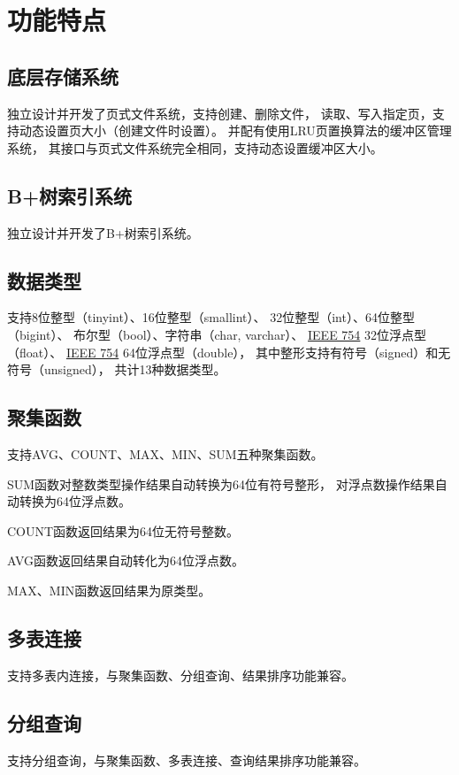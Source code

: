 \section{功能特点}
    \subsection{底层存储系统}
        独立设计并开发了页式文件系统，支持创建、删除文件，%
        读取、写入指定页，支持动态设置页大小（创建文件时设置）。%
        并配有使用LRU页置换算法的缓冲区管理系统，%
        其接口与页式文件系统完全相同，支持动态设置缓冲区大小。
    \subsection{B+树索引系统}
        独立设计并开发了B+树索引系统。
    \subsection{数据类型}
        支持8位整型（tinyint）、16位整型（smallint）、%
        32位整型（int）、64位整型（bigint）、
        布尔型（bool）、字符串（char, varchar）、%
        \href{http://www.eecs.berkeley.edu/~wkahan/ieee754status/IEEE754.PDF}{IEEE 754}
        32位浮点型（float）、%
        \href{http://www.eecs.berkeley.edu/~wkahan/ieee754status/IEEE754.PDF}{IEEE 754}
        64位浮点型（double），
        其中整形支持有符号（signed）和无符号（unsigned），%
        共计13种数据类型。
    \subsection{聚集函数}
        支持AVG、COUNT、MAX、MIN、SUM五种聚集函数。

        SUM函数对整数类型操作结果自动转换为64位有符号整形，%
        对浮点数操作结果自动转换为64位浮点数。

        COUNT函数返回结果为64位无符号整数。

        AVG函数返回结果自动转化为64位浮点数。

        MAX、MIN函数返回结果为原类型。
    \subsection{多表连接}
        支持多表内连接，与聚集函数、分组查询、结果排序功能兼容。
    \subsection{分组查询}
        支持分组查询，与聚集函数、多表连接、查询结果排序功能兼容。
